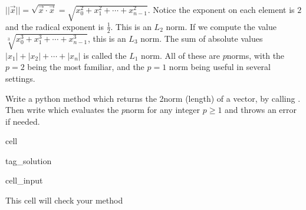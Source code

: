 \documentclass[letterpaper,10pt,english]{jupyterBook}
\begin{document}
\sphinxAtStartPar
\(||\vec{x} || = \sqrt{\vec{x} \cdot \vec{x}} = \sqrt{x_0^2 + x_1^2 + \cdots + x_{n-1}^2}\). Notice the exponent on each element is \(2\) and the radical exponent is \(\frac12\). This is an \(L_2\) norm. If we compute the value \(\sqrt[3]{x_0^3 + x_1^3 + \cdots + x_{n-1}^3}\), this is an \(L_3\) norm. The sum of absolute values \(|x_1| + |x_2| + \cdots + |x_n|\) is called the \(L_1\) norm. All of these are \(p\)\sphinxhyphen{}norms, with the \(p=2\) being the most familiar, and the \(p=1\) norm being useful in several settings.

\sphinxAtStartPar
Write a python method  which returns the 2\sphinxhyphen{}norm (length) of a vector, by calling . Then write  which evaluates the \(p\)\sphinxhyphen{}norm for any integer \(p \geq 1\) and throws an error if needed.

\begin{sphinxuseclass}{cell}
\begin{sphinxuseclass}{tag_solution}\begin{sphinxVerbatimInput}

\begin{sphinxuseclass}{cell_input}
\begin{sphinxVerbatim}[commandchars=\\\{\}]
\end{sphinxVerbatim}

\end{sphinxuseclass}\end{sphinxVerbatimInput}

\end{sphinxuseclass}
\end{sphinxuseclass}
\sphinxAtStartPar
This cell will check your method
\end{document}
